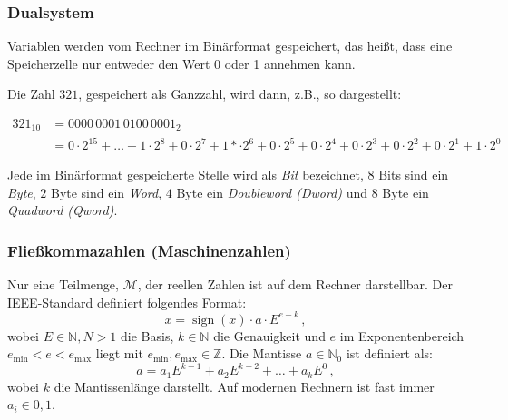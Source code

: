 \iflecturer
\begin{framed}
  
  \blackboard{}
\end{framed}
\fi

\subsubsection{Dualsystem}

\iflecturer
\begin{framed}
  \blackboard{}
\end{framed}
\fi

Variablen werden vom Rechner im Binärformat gespeichert, das heißt, dass eine Speicherzelle nur entweder den Wert 0 oder 1 annehmen kann.

Die Zahl $321$, gespeichert als Ganzzahl, wird dann, z.B., so dargestellt:

\begin{align*}
  321_{10} & = 0000 \, 0001 \, 0100 \, 0001_{2} \\
           & = 0\cdot2^{15} + \ldots + 1\cdot2^8 + 0\cdot2^7 + 1*\cdot2^6 + 0\cdot2^5 + 0\cdot2^4 + 0\cdot2^3 + 0\cdot2^2 + 0\cdot2^1 + 1\cdot2^0
\end{align*}

Jede im Binärformat gespeicherte Stelle wird als \emph{Bit} bezeichnet, $8$ Bits sind ein \emph{Byte}, $2$ Byte sind ein \emph{Word}, $4$ Byte ein \emph{Doubleword (Dword)} und $8$ Byte ein \emph{Quadword (Qword)}. 

\subsubsection{Fließkommazahlen (Maschinenzahlen)}

\iflecturer
\begin{framed}
  \blackboard{}
\end{framed}
\fi

Nur eine Teilmenge, $\mathcal{M}$, der reellen Zahlen ist auf dem Rechner darstellbar.
Der IEEE-Standard definiert folgendes Format:
\begin{equation*}
  x = \operatorname{sign}(x) \cdot a \cdot E^{e-k} \, ,
\end{equation*}
wobei $E\in\mathbb{N}, N>1$ die Basis, $k\in\mathbb{N}$ die Genauigkeit und $e$ im Exponentenbereich $e_\mathrm{min} < e < e_\mathrm{max}$ liegt mit $e_\mathrm{min}, e_\mathrm{max}\in \mathbb{Z}$.
Die Mantisse $a\in\mathbb{N}_0$ ist definiert als:
\begin{equation*}
  a = a_1 E^{k-1} + a_2 E^{k-2} + \ldots + a_k E^0 \, ,
\end{equation*}
wobei $k$ die Mantissenlänge darstellt.
Auf modernen Rechnern ist fast immer $a_i\in{0,1} $.

